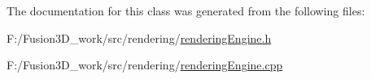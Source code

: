 The documentation for this class was generated from the following files\+:\begin{DoxyCompactItemize}
\item 
F\+:/\+Fusion3\+D\+\_\+work/src/rendering/\hyperlink{rendering_engine_8h}{rendering\+Engine.\+h}\item 
F\+:/\+Fusion3\+D\+\_\+work/src/rendering/\hyperlink{rendering_engine_8cpp}{rendering\+Engine.\+cpp}\end{DoxyCompactItemize}
